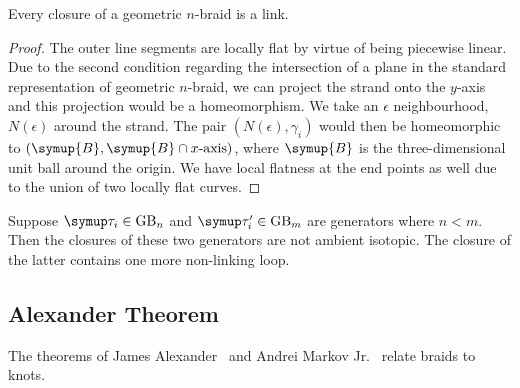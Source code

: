 \begin{prop}
	Every closure of a geometric \(n\)-braid is a link.
\end{prop}
\begin{proof}[Proof]
	The outer line segments are locally flat by virtue of being piecewise linear. Due to the second condition regarding the intersection of a plane in the standard representation of geometric \(n\)-braid, we can project the strand onto the \(y\)-axis and this projection would be a homeomorphism. We take an \(\epsilon\) neighbourhood, \(N(\epsilon)\) around the strand. The pair \((N(\epsilon), \gamma_i)\) would then be homeomorphic to \((\symup{B}, \symup{B} \cap x\text{-axis})\), where \(\symup{B}\) is the three-dimensional unit ball around the origin. We have local flatness at the end points as well due to the union of two locally flat curves.
\end{proof}

\begin{remark}
	Suppose \(\tauu_i \in \GB_n\) and \(\tauu_i' \in \GB_{m}\) are generators where \(n < m\). Then the closures of these two generators are not ambient isotopic. The closure of the latter contains one more non-linking loop.
\end{remark}
\subsection{Alexander Theorem}

The theorems of James Alexander~\cite{alexander} and Andrei Markov Jr.~\cite{markov} relate braids to knots.

